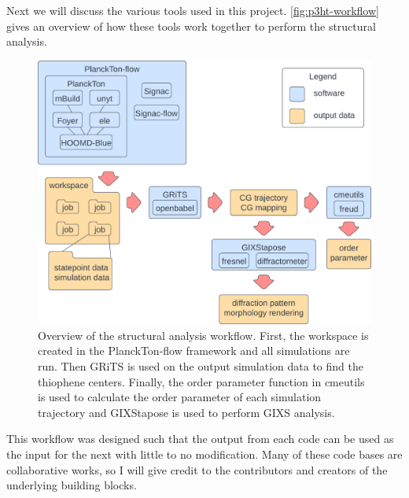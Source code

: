 Next we will discuss the various tools used in this project.  \autoref{fig:p3ht-workflow} gives an overview of how these tools work together to perform the structural analysis.
\begin{figure}[h!]
    \centering
    \includegraphics[width=0.8\linewidth]{figures/p3ht_val/workflow.png}
    \caption{Overview of the structural analysis workflow. First, the workspace is created in the PlanckTon-flow framework and all simulations are run. Then GRiTS is used on the output simulation data to find the thiophene centers. Finally, the order parameter function in cmeutils is used to calculate the order parameter of each simulation trajectory and GIXStapose is used to perform GIXS analysis.}\label{fig:p3ht-workflow}
\end{figure}
This workflow was designed such that the output from each code can be used as the input for the next with little to no modification. 
Many of these code bases are collaborative works, so I will give credit to the contributors and creators of the underlying building blocks.

